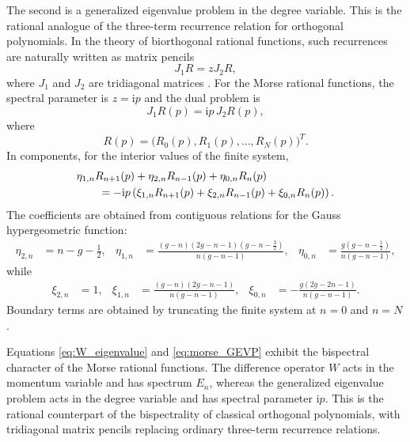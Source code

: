 \documentclass[10pt,a4paper]{amsart}
\newcommand{\ii}{\mathrm{i}}
\numberwithin{equation}{section}
\begin{document}
The second is a generalized eigenvalue problem in the degree variable.  This is the rational
analogue of the three-term recurrence relation for orthogonal polynomials.  In the theory of
biorthogonal rational functions, such recurrences are naturally written as matrix pencils
\begin{equation}
  J_1 R=zJ_2 R,
  \label{eq:abstract_GEVP}
\end{equation}
where $J_1$ and $J_2$ are tridiagonal matrices \cite{Zhedanov1999}.  For the Morse rational
functions, the spectral parameter is $z=\ii p$ and the dual problem is
\begin{equation}
  J_1R(p)=\ii p\,J_2R(p),
  \label{eq:morse_GEVP}
\end{equation}
where
\begin{equation}
  R(p)=\bigl(R_0(p),R_1(p),\dots,R_N(p)\bigr)^T.
\end{equation}
In components, for the interior values of the finite system,
\begin{align}
  &\eta_{1,n}R_{n+1}(p)+\eta_{2,n}R_{n-1}(p)+\eta_{0,n}R_n(p)
  \notag\\
  &\qquad
  =-\ii p\left(
  \xi_{1,n}R_{n+1}(p)+\xi_{2,n}R_{n-1}(p)+\xi_{0,n}R_n(p)
  \right).
  \label{eq:component_GEVP}
\end{align}
The coefficients are obtained from contiguous relations for the Gauss hypergeometric function:
\begin{align}
  \eta_{2,n}&=n-g-\frac12,
  &
  \eta_{1,n}&=
  \frac{(g-n)(2g-n-1)(g-n-\frac32)}{n(g-n-1)},
  &
  \eta_{0,n}&=
  \frac{g(g-n-\frac12)}{n(g-n-1)},
  \label{eq:eta_coefficients}
\end{align}
while
\begin{align}
  \xi_{2,n}&=1,
  &
  \xi_{1,n}&=
  \frac{(g-n)(2g-n-1)}{n(g-n-1)},
  &
  \xi_{0,n}&=-
  \frac{g(2g-2n-1)}{n(g-n-1)}.
  \label{eq:xi_coefficients}
\end{align}
Boundary terms are obtained by truncating the finite system at $n=0$ and $n=N$.

Equations \eqref{eq:W_eigenvalue} and \eqref{eq:morse_GEVP} exhibit the bispectral character of
the Morse rational functions.  The difference operator $W$ acts in the momentum variable and has
spectrum $E_n$, whereas the generalized eigenvalue problem acts in the degree variable and has
spectral parameter $\ii p$.  This is the rational counterpart of the bispectrality of classical
orthogonal polynomials, with tridiagonal matrix pencils replacing ordinary three-term recurrence
relations.
\end{document}
